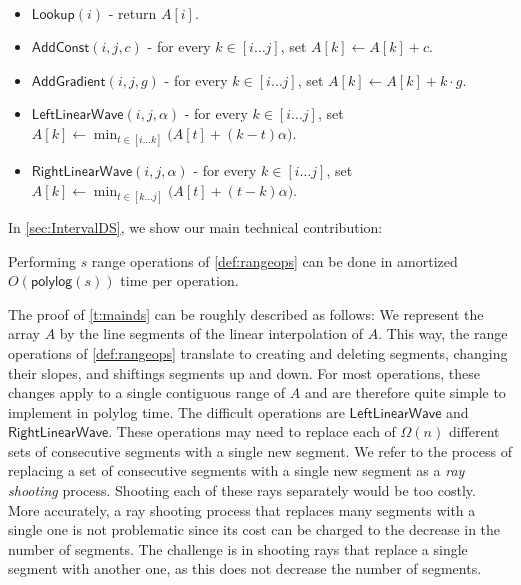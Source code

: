 \documentclass[a4paper,UKenglish,cleveref, autoref, thm-restate]{lipics-v2021}
\newcommand{\AC}{\mathsf{AddConst}}
\newcommand{\AG}{\mathsf{AddGradient}}
\newcommand{\LLW}{\mathsf{LeftLinearWave}}
\newcommand{\RLW}{\mathsf{RightLinearWave}}
\newcommand{\Lookup}{\mathsf{Lookup}}
\newcommand{\polylog}{\mathsf{polylog}}
\begin{document}
\begin{definition}\label{def:rangeops}
\
\begin{itemize}
    \item $\Lookup(i)$ - return $A[i]$.
    \item $\AC(i,j,c)$ -  for every $k\in [i\ldots j]$, set $A[k] \leftarrow A[k]+c$.
    \item $\AG(i,j,g)$ - for every $k\in [i\ldots j]$, set $A[k] \leftarrow A[k]+ k \cdot g$.
    \item $\LLW(i,j,\alpha)$ - for every $k\in [i\ldots j]$, set $A[k] \leftarrow \min_{t \in [i\ldots k]} \big(A[t] + (k-t)\alpha \big)$. 
    \item $\RLW(i,j,\alpha)$ - for every $k\in [i\ldots j]$, set  $A[k] \leftarrow \min_{t \in [k\ldots j]} \big(A[t] + (t-k)\alpha \big)$.
\end{itemize}

\end{definition}

In \cref{sec:IntervalDS}, we show our main technical contribution:  

\begin{theorem}\label{t:mainds}
Performing $s$ range operations of \cref{def:rangeops} can be done in amortized $O(\polylog (s))$ time per operation.
\end{theorem}

The proof of \cref{t:mainds} can be roughly described as follows: We represent the array $A$ by the line segments of the linear interpolation of $A$.
This way, the range operations of \cref{def:rangeops} translate to creating and deleting segments, changing their slopes, and shiftings segments up and down. For most operations, these changes apply to a single contiguous range of $A$ and are therefore quite simple to implement in polylog time. 
The difficult operations are $\LLW$ and $\RLW$. These operations may need to replace each of $\Omega(n)$ different sets of consecutive segments with a single new segment. We refer to the process of replacing  a set of consecutive segments with a single new segment as a {\em ray shooting} process.
Shooting each of these rays separately would be too costly.
More accurately, a ray shooting process that replaces many segments with a single one is not problematic since its cost can be charged to the decrease in the number of segments.
The challenge is in shooting rays that replace a single segment with another one, as this does not decrease the number of segments. 
\end{document}
